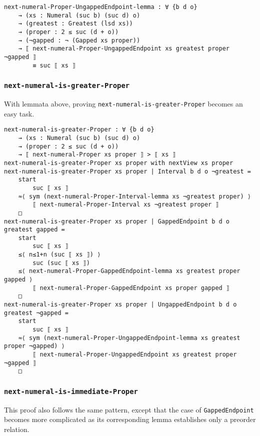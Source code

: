 \documentclass[\main/thesis.tex]{subfiles}
\begin{document}
\begin{lstlisting}[basicstyle=\ttfamily\scriptsize]
next-numeral-Proper-UngappedEndpoint-lemma : ∀ {b d o}
    → (xs : Numeral (suc b) (suc d) o)
    → (greatest : Greatest (lsd xs))
    → (proper : 2 ≤ suc (d + o))
    → (¬gapped : ¬ (Gapped xs proper))
    → ⟦ next-numeral-Proper-UngappedEndpoint xs greatest proper ¬gapped ⟧
        ≡ suc ⟦ xs ⟧
\end{lstlisting}

\subsubsection{{\lstinline|next-numeral-is-greater-Proper|}}

With lemmata above, proving {\lstinline|next-numeral-is-greater-Proper|} becomes
an easy task.

\begin{lstlisting}[basicstyle=\ttfamily\scriptsize]
next-numeral-is-greater-Proper : ∀ {b d o}
    → (xs : Numeral (suc b) (suc d) o)
    → (proper : 2 ≤ suc (d + o))
    → ⟦ next-numeral-Proper xs proper ⟧ > ⟦ xs ⟧
next-numeral-is-greater-Proper xs proper with nextView xs proper
next-numeral-is-greater-Proper xs proper | Interval b d o ¬greatest =
    start
        suc ⟦ xs ⟧
    ≈⟨ sym (next-numeral-Proper-Interval-lemma xs ¬greatest proper) ⟩
        ⟦ next-numeral-Proper-Interval xs ¬greatest proper ⟧
    □
next-numeral-is-greater-Proper xs proper | GappedEndpoint b d o greatest gapped =
    start
        suc ⟦ xs ⟧
    ≤⟨ n≤1+n (suc ⟦ xs ⟧) ⟩
        suc (suc ⟦ xs ⟧)
    ≤⟨ next-numeral-Proper-GappedEndpoint-lemma xs greatest proper gapped ⟩
        ⟦ next-numeral-Proper-GappedEndpoint xs proper gapped ⟧
    □
next-numeral-is-greater-Proper xs proper | UngappedEndpoint b d o greatest ¬gapped =
    start
        suc ⟦ xs ⟧
    ≈⟨ sym (next-numeral-Proper-UngappedEndpoint-lemma xs greatest proper ¬gapped) ⟩
        ⟦ next-numeral-Proper-UngappedEndpoint xs greatest proper ¬gapped ⟧
    □
\end{lstlisting}

\subsubsection{{\lstinline|next-numeral-is-immediate-Proper|}}

This proof also follows the same pattern, except that the case of
{\lstinline|GappedEndpoint|} becomes more complicated as its corresponding lemma
establishes only a preorder relation.
\end{document}
